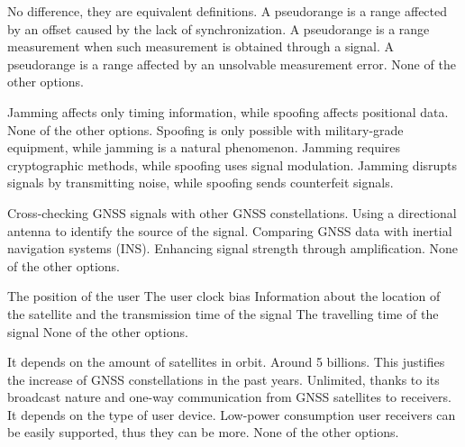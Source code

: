 \begin{checkboxes}
    \choice No difference, they are equivalent definitions.
    \CorrectChoice A pseudorange is a range affected by an offset caused by the lack of synchronization.
    \choice A pseudorange is a range measurement when such measurement is obtained through a signal.
    \choice A pseudorange is a range affected by an unsolvable measurement error.
    \choice None of the other options.
\end{checkboxes}

\begin{checkboxes}
    \choice Jamming affects only timing information, while spoofing affects positional data.
    \choice None of the other options.
    \choice Spoofing is only possible with military-grade equipment, while jamming is a natural phenomenon.
    \choice Jamming requires cryptographic methods, while spoofing uses signal modulation.
    \CorrectChoice Jamming disrupts signals by transmitting noise, while spoofing sends counterfeit signals.
\end{checkboxes}

\begin{checkboxes}
    \CorrectChoice Cross-checking GNSS signals with other GNSS constellations.
    \CorrectChoice Using a directional antenna to identify the source of the signal.
    \CorrectChoice Comparing GNSS data with inertial navigation systems (INS).
    \choice Enhancing signal strength through amplification.
    \choice None of the other options.
\end{checkboxes}

\begin{checkboxes}
    \choice The position of the user
    \choice The user clock bias
    \CorrectChoice Information about the location of the satellite and the transmission time of the signal
    \choice The travelling time of the signal
    \choice None of the other options.
\end{checkboxes}

\begin{checkboxes}
    \choice It depends on the amount of satellites in orbit.
    \choice Around 5 billions. This justifies the increase of GNSS constellations in the past years.
    \CorrectChoice Unlimited, thanks to its broadcast nature and one-way communication from GNSS satellites to receivers.
    \choice It depends on the type of user device. Low-power consumption user receivers can be easily supported, thus they can be more.
    \choice None of the other options.
\end{checkboxes}